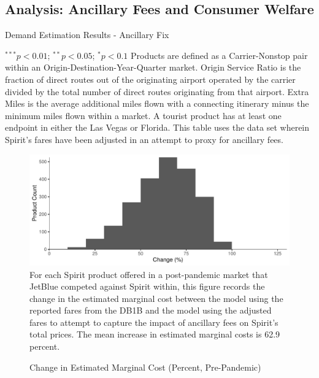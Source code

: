 \documentclass{article}
\begin{document}
\subsection{Analysis: Ancillary Fees and Consumer Welfare}

    \begin{table}
        \caption{Demand Estimation Results - Ancillary Fix}
        \label{tab:Demand_Aux_Scale}
         \vspace{-15mm}
        \begin{center}
        
        \end{center}
        \vspace{-5mm}
        \footnotesize{$^{***}p<0.01$; $^{**}p<0.05$; $^{*}p<0.1$ Products are defined as a Carrier-Nonstop pair within an Origin-Destination-Year-Quarter market. Origin Service Ratio is the fraction of direct routes out of the originating airport operated by the carrier divided by the total number of direct routes originating from that airport. Extra Miles is the average additional miles flown with a connecting itinerary minus the minimum miles flown within a market.  A tourist product has at least one endpoint in either the Las Vegas or Florida. This table uses the data set wherein Spirit's fares have been adjusted in an attempt to proxy for ancillary fees. }
    \end{table}

    \begin{figure}
        \caption{Change in Estimated Marginal Cost (Percent, Pre-Pandemic)}
        \label{tab:Fee_Fix_prepandemic_MC_PercentChange}
        \includegraphics[width = \linewidth]{Fee_Fix_prepandemic_MC_Graph_Percent_JBMarket.pdf}
        \footnotesize{For each Spirit product offered in a post-pandemic market that JetBlue competed against Spirit within, this figure records the change in the estimated marginal cost between the model using the reported fares from the DB1B and the model using the adjusted fares to attempt to capture the impact of ancillary fees on Spirit's total prices. The mean increase in estimated marginal costs is 62.9 percent.}
    \end{figure}
    
\end{document}
